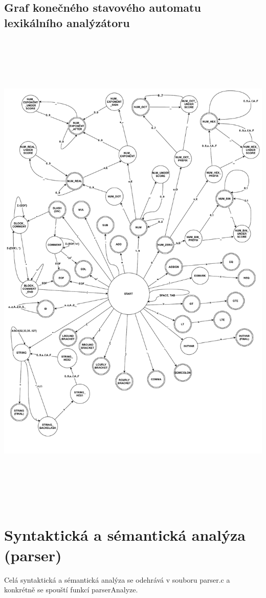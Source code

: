 \documentclass[a4paper, 12pt]{article}
\begin{document}
\subsection{Graf konečného stavového automatu lexikálního analýzátoru}
\includegraphics[height=24cm,keepaspectratio]{Scanner_FSM_Graph.pdf}

\section{Syntaktická a sémantická analýza (parser)}
Celá syntaktická a sémantická analýza se odehrává v souboru parser.c a konkrétně se spouští funkcí parserAnalyze.
\end{document}
